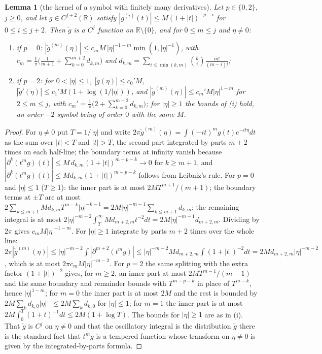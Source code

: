 \documentclass[11pt]{article}
\newtheorem{lemma}[theorem]{Lemma}
\theoremstyle{definition}
\theoremstyle{remark}
\newcommand{\R}{\mathbb{R}}
\begin{document}
\begin{lemma}[the kernel of a symbol with finitely many derivatives]\label{lem:symbolkernel}
Let $p\in\{0,2\}$, $j\ge0$, and let $g\in C^{j+2}(\R)$ satisfy $|g^{(i)}(t)|\le M(1+|t|)^{-p-i}$ for $0\le i\le j+2$. Then $\check g$ is a $C^j$ function on $\R\setminus\{0\}$, and for $0\le m\le j$ and $\eta\ne0$:
\begin{enumerate}
\item[(i)] if $p=0$: $|\check g^{(m)}(\eta)|\le c_mM\,|\eta|^{-1-m}\min(1,|\eta|^{-1})$, with $c_m=\frac1\pi\big(\frac1{m+1}+\sum_{k=0}^{m+2}d_{k,m}\big)$ and $d_{k,m}=\sum_{i\le\min(k,m)}\binom ki\frac{m!}{(m-i)!}$;
\item[(ii)] if $p=2$: for $0<|\eta|\le1$, $|\check g(\eta)|\le c_0'M$, $|\check g'(\eta)|\le c_1'M(1+\log(1/|\eta|))$, and $|\check g^{(m)}(\eta)|\le c_m'M|\eta|^{1-m}$ for $2\le m\le j$, with $c_m'=\frac1\pi\big(2+\sum_{k=0}^{m+2}d_{k,m}\big)$; for $|\eta|\ge1$ the bounds of (i) hold, an order $-2$ symbol being of order $0$ with the same $M$.
\end{enumerate}
\end{lemma}
\begin{proof}
For $\eta\ne0$ put $T=1/|\eta|$ and write $2\pi\check g^{(m)}(\eta)=\int(-it)^mg(t)e^{-it\eta}dt$ as the sum over $|t|<T$ and $|t|>T$, the second part integrated by parts $m+2$ times on each half-line; the boundary terms at infinity vanish because $|\partial^k(t^mg)(t)|\le M\,d_{k,m}(1+|t|)^{m-p-k}\to0$ for $k\ge m+1$, and $|\partial^k(t^mg)(t)|\le Md_{k,m}(1+|t|)^{m-p-k}$ follows from Leibniz's rule. For $p=0$ and $|\eta|\le1$ ($T\ge1$): the inner part is at most $2MT^{m+1}/(m+1)$; the boundary terms at $\pm T$ are at most $2\sum_{k\le m+1}Md_{k,m}T^{m-k}|\eta|^{-k-1}=2M|\eta|^{-m-1}\sum_{k\le m+1}d_{k,m}$; the remaining integral is at most $2|\eta|^{-m-2}\int_T^\infty Md_{m+2,m}t^{-2}dt=2M|\eta|^{-m-1}d_{m+2,m}$. Dividing by $2\pi$ gives $c_mM|\eta|^{-1-m}$. For $|\eta|\ge1$ integrate by parts $m+2$ times over the whole line: $2\pi|\check g^{(m)}(\eta)|\le|\eta|^{-m-2}\int|\partial^{m+2}(t^mg)|\le|\eta|^{-m-2}Md_{m+2,m}\int(1+|t|)^{-2}dt=2Md_{m+2,m}|\eta|^{-m-2}$, which is at most $2\pi c_mM|\eta|^{-m-2}$. For $p=2$ the same splitting with the extra factor $(1+|t|)^{-2}$ gives, for $m\ge2$, an inner part at most $2MT^{m-1}/(m-1)$ and the same boundary and remainder bounds with $T^{m-p-k}$ in place of $T^{m-k}$, hence $|\eta|^{1-m}$; for $m=0$ the inner part is at most $2M$ and the rest is bounded by $2M\sum_kd_{k,0}|\eta|^{\dots}\le2M\sum_kd_{k,0}$ for $|\eta|\le1$; for $m=1$ the inner part is at most $2M\int_0^T(1+t)^{-1}dt\le2M(1+\log T)$. The bounds for $|\eta|\ge1$ are as in (i). That $\check g$ is $C^j$ on $\eta\ne0$ and that the oscillatory integral is the distribution $\check g$ there is the standard fact that $t^mg$ is a tempered function whose transform on $\eta\ne0$ is given by the integrated-by-parts formula.
\end{proof}
\end{document}
